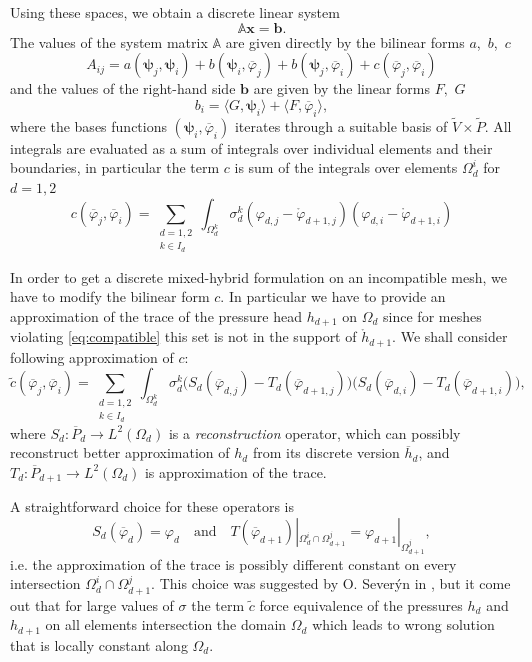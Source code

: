 \documentclass[times]{nlaauth}%
\def\to{\rightarrow}
\def\vc#1{\mathbf{\boldsymbol{#1}}}     %
\def\tn#1{{\mathbb{#1}}}    %
\def\ol#1{\overline{#1}}
\def\phi{\varphi}
\begin{document}
Using these spaces, we obtain a discrete linear system
\begin{equation}
\label{eq:discrete_system}
\tn A\vc x=\vc b.
\end{equation} The values of the system matrix $\tn A$ are given directly 
by the bilinear forms $a$,~$b$,~$c$
\[
 A_{ij} = a(\vc \psi_j, \vc \psi_i) + b(\vc \psi_i, \ol\phi_j) + b(\vc \psi_j, \ol \phi_i) + c(\ol\phi_j,\ol\phi_i)
\]
and the values of the right-hand side $\vc b$ are given by the linear forms $F,$ $G$
\[
 b_{i} = \langle G, \vc \psi_i \rangle + \langle F, \ol \phi_i \rangle,
\]
where the bases functions $(\vc \psi_i, \ol \phi_i)$ iterates through a suitable basis of $\tilde V\times \tilde P$.
All integrals are evaluated as a sum of integrals over individual elements and their boundaries, in particular
the term $c$ is sum of the integrals over elements $\Omega_d^i$ for $d=1,2$
\begin{equation}
  c(\ol\phi_j,\ol\phi_i) = \sum_{\substack{d=1,2\\k\in I_{d}}} \int_{\Omega_d^k} 
   \sigma_{d}^k(\phi_{d,j} - \mathring{\phi}_{d+1,j})(\phi_{d,i} - \mathring{\phi}_{d+1,i})   
\end{equation}


In order to get a discrete mixed-hybrid formulation on an incompatible mesh, we have to modify the bilinear form $c$.
In particular we have to provide an approximation of the trace of the pressure head $h_{d+1}$ 
on $\Omega_d$ since for meshes violating \eqref{eq:compatible} this set is not in the support of $\mathring h_{d+1}$.
We shall consider following approximation of $c$:
\begin{equation}
  \tilde{c}(\ol\phi_j,\ol\phi_i) = \sum_{\substack{d=1,2\\k\in I_{d}}} \int_{\Omega_d^k} 
   \sigma_{d}^k\big(S_d(\ol\phi_{d,j}) - T_d(\ol\phi_{d+1,j}) \big)
                 \big(S_d(\ol\phi_{d,i}) - T_d(\ol\phi_{d+1,i}) \big),
\end{equation}
where $S_d:\ol P_d \to L^2(\Omega_d)$ is a {\it reconstruction} operator, which can possibly reconstruct better 
approximation of $h_d$ from its discrete version $\ol h_d$, and  $T_d:\ol P_{d+1} \to L^2(\Omega_d)$ 
is approximation of the trace.

A straightforward choice for these operators is 
\begin{equation}
  S_d(\ol\phi_d)=\phi_d\quad \text{and} \quad T(\ol\phi_{d+1})|_{\Omega_d^i \cap \Omega_{d+1}^j} = \phi_{d+1}|_{\Omega_{d+1}^j},
\end{equation}
i.e. the approximation of the trace is possibly different constant on every intersection $\Omega_d^i \cap \Omega_{d+1}^j$.
This choice was suggested by O. Sever\'yn in \cite{sembera_novel_2007}, but it come out that for large values of 
$\sigma$ the term $\tilde c$ force
equivalence of the pressures $h_d$ and $h_{d+1}$ on all elements intersection the domain $\Omega_d$ which leads to wrong 
solution that is locally constant along $\Omega_d$. 
\end{document}
